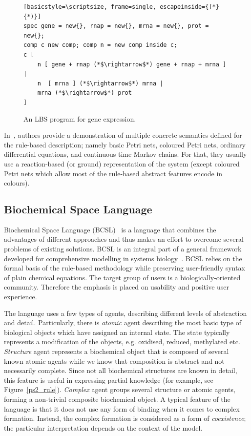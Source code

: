 \documentclass[11pt,a4paper]{report}
\begin{document}
\begin{figure}[!h]
\lstset{language=LBS}
\begin{lstlisting}[basicstyle=\scriptsize, frame=single, escapeinside={(*}{*)}]
spec gene = new{}, rnap = new{}, mrna = new{}, prot = new{}; 
comp c new comp; comp n = new comp inside c;
c [ 
	n [ gene + rnap (*$\rightarrow$*) gene + rnap + mrna ] | 
	n  [ mrna ] (*$\rightarrow$*) mrna | 
	mrna (*$\rightarrow$*) prot
]
\end{lstlisting}
\caption{An LBS program for gene expression.}\label{LBS_example}
\end{figure}

In~\cite{Pedersen}, authors provide a demonstration of multiple concrete semantics defined for the rule-based description; namely basic Petri nets, coloured Petri nets, ordinary differential equations, and continuous time Markov chains. For that, they usually use a reaction-based (or ground) representation of the system (except coloured Petri nets which allow most of the rule-based abstract features encode in colours).

\subsection{Biochemical Space Language}

Biochemical Space Language (BCSL)~\cite{trojak2018sasb} is a language that combines the advantages of different approaches and thus makes an effort to overcome several problems of existing solutions. BCSL is an integral part of a general framework developed for comprehensive modelling in systems biology~\cite{klement2013comprehensive,BCS}. BCSL relies on the formal basis of the rule-based methodology while preserving user-friendly syntax of plain chemical equations. The target group of users is a biologically-oriented community. Therefore the emphasis is placed on usability and positive user experience.

The language uses a few types of agents, describing different levels of abstraction and detail. Particularly, there is \emph{atomic} agent describing the most basic type of biological objects which have assigned an internal state. The state typically represents a modification of the objects, e.g. oxidised, reduced, methylated etc. \emph{Structure} agent represents a biochemical object that is composed of several known atomic agents while we know that composition is abstract and not necessarily complete. Since not all biochemical structures are known in detail, this feature is useful in expressing partial knowledge (for example, see Figure~\ref{ps2_rule}). \emph{Complex} agent groups several structure or atomic agents, forming a non-trivial composite biochemical object. A typical feature of the language is that it does not use any form of binding when it comes to complex formation. Instead, the complex formation is considered as a form of \emph{coexistence}; the particular interpretation depends on the context of the model.
\end{document}
